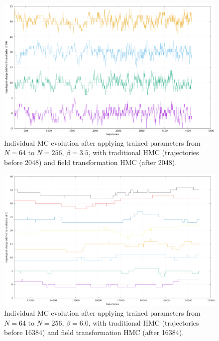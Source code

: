 \begin{figure}
	\centering
	\includegraphics[width=\textwidth]{../topoevoN256.png}
	\caption{\label{topo-evo-n256}Individual MC evolution after
		applying trained parameters from $N=64$ to $N=256$, $β=3.5$,
		with traditional HMC (trajectories before 2048)
		and field transformation HMC (after 2048).}
\end{figure}

\begin{figure}
	\centering
	\includegraphics[width=\textwidth]{../topoevoN256_b6.png}
	\caption{\label{topo-evo-n256-b6}Individual MC evolution after
		applying trained parameters from $N=64$ to $N=256$, $β=6.0$,
		with traditional HMC (trajectories before 16384)
		and field transformation HMC (after 16384).}
\end{figure}

